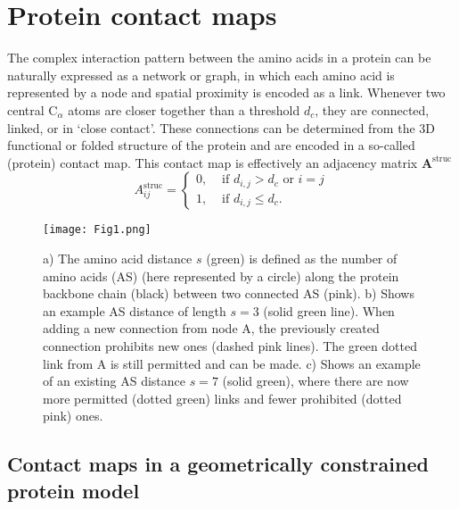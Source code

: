\documentclass[
reprint,
twocolumn,
amsmath,amssymb,superscriptaddress,aps,
pre]{revtex4-1}
\begin{document}
\section{Protein contact maps}
\label{sec:methods}
The complex interaction pattern between the amino acids in a protein can be naturally expressed as a network or graph, in which each amino acid is represented by a node and spatial proximity is encoded as a link. Whenever two central $\mathrm{C}_\alpha$ atoms are closer together than a threshold $d_c$, they are connected, linked, or in `close contact'. These connections can be determined from the 3D functional or folded structure of the protein and are encoded in a so-called (protein) contact map. This contact map is effectively an adjacency matrix $\textbf{A}^{\mathrm{struc}}$ 
\begin{equation}
  A^{\mathrm{struc}}_{ij}=
  \begin{cases}
   0, & \text{ if } d_{i,j}>d_c \text{ or } i=j\\
      1, & \text{ if } d_{i,j}\leq d_c.
      \end{cases}
    \label{eq:aij}
\end{equation}

\begin{figure}[h!]
    \centering
    \texttt{[image: Fig1.png]}
    \caption{a) The amino acid distance $s$ (green) is defined as the number of amino acids (AS) (here represented by a circle) along the protein backbone chain (black) between two connected AS (pink). b) Shows an example AS distance of length $s=3$ (solid green line). When adding a new connection from node A, the previously created connection prohibits new ones (dashed pink lines). The green dotted link from A is still permitted and can be made. c) Shows an example of an existing AS distance $s=7$ (solid green), where there are now more permitted (dotted green) links and fewer prohibited (dotted pink) ones.}
    \label{fig:schematic}
\end{figure}

\subsection{Contact maps in a geometrically constrained protein model}
\end{document}
